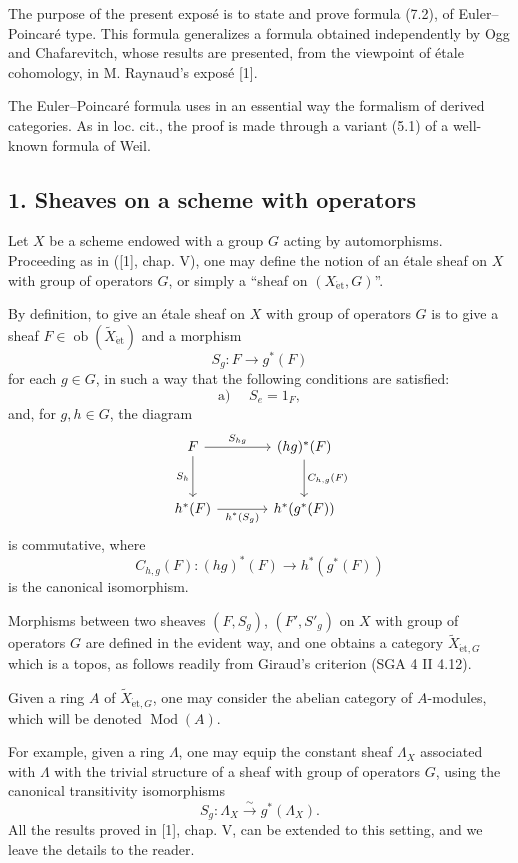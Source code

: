 \documentclass[11pt]{article}
\providecommand{\et}{\mathrm{\acute{e}t}}
\providecommand{\Ob}{\operatorname{ob}}
\providecommand{\Ob}{\operatorname{ob}}
\providecommand{\Ob}{\operatorname{Ob}}
\providecommand{\Mod}{\operatorname{Mod}}
\begin{document}
The purpose of the present exposé is to state and prove formula (7.2), of Euler--Poincaré type. This formula generalizes a formula obtained independently by Ogg and Chafarevitch, whose results are presented, from the viewpoint of étale cohomology, in M. Raynaud's exposé [1].

The Euler--Poincaré formula uses in an essential way the formalism of derived categories. As in loc. cit., the proof is made through a variant (5.1) of a well-known formula of Weil.

\subsection*{1. Sheaves on a scheme with operators}

Let $X$ be a scheme endowed with a group $G$ acting by automorphisms. Proceeding as in ([1], chap. V), one may define the notion of an étale sheaf on $X$ with group of operators $G$, or simply a “sheaf on $(X_{\et},G)$”.

By definition, to give an étale sheaf on $X$ with group of operators $G$ is to give a sheaf $F\in \Ob(\widetilde X_{\et})$ and a morphism
\[
S_g:F\longrightarrow g^*(F)
\]
for each $g\in G$, in such a way that the following conditions are satisfied:
\[
\text{a) }\quad S_e=1_F,
\]
and, for $g,h\in G$, the diagram
\[
\begin{tikzcd}[column sep=large,row sep=large]
F \arrow[r,"S_{hg}"] \arrow[d,"S_h"'] & (hg)^*(F) \arrow[d,"C_{h,g}(F)"]\\
h^*(F) \arrow[r,"h^*(S_g)"'] & h^*(g^*(F))
\end{tikzcd}
\]
is commutative, where
\[
C_{h,g}(F):(hg)^*(F)\longrightarrow h^*(g^*(F))
\]
is the canonical isomorphism.

Morphisms between two sheaves $(F,S_g)$, $(F',S'_g)$ on $X$ with group of operators $G$ are defined in the evident way, and one obtains a category $\widetilde X_{\et,G}$ which is a topos, as follows readily from Giraud's criterion (SGA 4 II 4.12).

Given a ring $A$ of $\widetilde X_{\et,G}$, one may consider the abelian category of $A$-modules, which will be denoted $\Mod(A)$.

For example, given a ring $\Lambda$, one may equip the constant sheaf $\Lambda_X$ associated with $\Lambda$ with the trivial structure of a sheaf with group of operators $G$, using the canonical transitivity isomorphisms
\[
S_g:\Lambda_X\xrightarrow{\sim}g^*(\Lambda_X).
\]
All the results proved in [1], chap. V, can be extended to this setting, and we leave the details to the reader.
\end{document}
